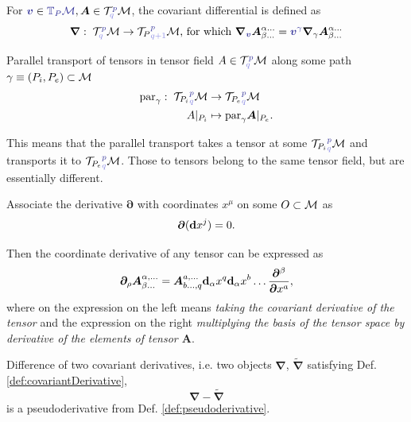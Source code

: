 \begin{definition}
    For $\bluee{\bm v} \in \bluee{\T_P\M}, \bm A\in \TT^{\bluee p}_{\blueee q} \M$, the covariant differential is defined as
    $$\bm\nabla:\; \TT^{\bluee p}_{\blueee q} \M \rightarrow {\TT_P}^{\bluee p}_{\blueee{q+1}} \M
    \text{, for which } \bm\nabla_{\bluee{\bm v}}\bm A^{\alpha\dots}_{\beta\dots}=\bluee{\bm v^\gamma} \bm\nabla_{\gamma}\bm A^{\alpha\dots}_{\beta\dots}$$
\end{definition}

\begin{definition}
    Parallel transport of tensors in tensor field $A\in \TT^{\bluee p}_{\blueee q} \M$ along some path $\gamma\equiv  (P_i,P_e)\subset \mathcal{M}$ 
    \begin{align*}
        \Par_\gamma:\; {\TT _{P_i}}^{\bluee p}_{\blueee q}\M&\rightarrow {\TT_{P_e}}^{\bluee p}_{\blueee q}\M\\
        A|_{P_i} &\mapsto \Par_\gamma \bm A|_{P_e}.
    \end{align*}
\end{definition}
This means that the parallel transport takes a tensor at some ${\TT_{P_i}}^{\bluee p}_{\blueee q} \M$ and transports it to ${\TT_{P_e}}^{\bluee p}_{\blueee q} \M$.  Those to tensors belong to the same tensor field, but are essentially different.

\begin{definition}
    Associate the derivative $\bm \partial$ with coordinates $x^\mu$ on some $O\subset\mathcal{M}$ as
    $$\bm \partial (\bm {\mathrm{d}} x^j)=0.$$
\end{definition}
Then the coordinate derivative of any tensor can be expressed as
\begin{equation}
    \bm \partial_\rho \bm A^{\alpha,\dots}_{\beta\dots} = \bm A^{a,\dots}_{b\dots,q}\bm {\mathrm{d}}_\alpha x^q \bm {\mathrm{d}}_\alpha x^b  \dots \frac{\bm \partial^\beta}{\bm \partial x^a},
\end{equation}
where on the expression on the left means \emph{taking the covariant derivative of the tensor} and the expression on the right \emph{multiplying the basis of the tensor space by derivative of the elements of tensor $\bm A$}.
\begin{thm}
     Difference of two covariant derivatives, i.e. two objects $\bm \nabla$, $\bm{\tilde\nabla}$ satisfying Def. \ref{def:covariantDerivative},
      $$\bm\nabla-\bm{\tilde\nabla}$$
    is a pseudoderivative from Def. \ref{def:pseudoderivative}.
\end{thm}

